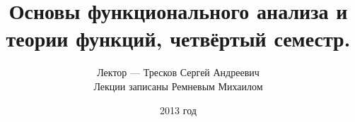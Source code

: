 \documentclass[a5paper, 12pt]{article}
\begin{document}
	\title{Основы функционального анализа и теории функций, четвёртый семестр.}
    \author
    {
		Лектор --- Тресков Сергей Андреевич\\
		Лекции записаны Ремневым Михаилом
    }
    \date{2013 год}
    \maketitle
    
    \tableofcontents %

	\pagebreak
	
    
    
    
    
\end{document}
